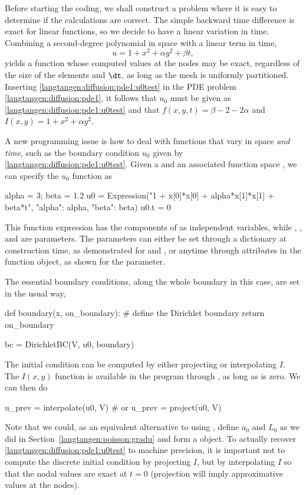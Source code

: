 Before starting the coding, we shall construct a problem where it is
easy to determine if the calculations are correct. The simple backward
time difference is exact for linear functions, so we decide to have
a linear variation in time. Combining a second-degree polynomial in space
with a linear term in time,
\begin{equation}
  u = 1 + x^2 + \alpha y^2 + \beta t,
\label{langtangen:diffusion:pde1:u0test}
\end{equation}
yields a function whose computed values at the nodes may be exact,
regardless of the size of the elements and ${\dt}$, as long as the mesh is
uniformly partitioned.  Inserting \eqref{langtangen:diffusion:pde1:u0test}
in the PDE problem \eqref{langtangen:diffusion:pde1}, it follows that
$u_0$ must be given as \eqref{langtangen:diffusion:pde1:u0test} and that
$f(x,y,t)=\beta - 2 - 2\alpha$ and $I(x,y)=1+x^2+\alpha y^2$.

A new programming issue is how to deal with functions that vary in
space \emph{and time}, such as the boundary condition $u_0$ given by
\eqref{langtangen:diffusion:pde1:u0test}.  Given a  and an
associated function space , we can specify the $u_0$ function
as 
\begin{python}
alpha = 3; beta = 1.2
u0 = Expression("1 + x[0]*x[0] + alpha*x[1]*x[1] + beta*t",
                {"alpha": alpha, "beta": beta})
u0.t = 0
\end{python}
This function expression has the components of  as independent
variables, while , , and  are parameters.
The parameters can either be set through a dictionary at construction
time, as demonstrated for  and , or anytime through
attributes in the function object, as shown for the  parameter.

The essential boundary conditions, along the whole boundary in this case,
are set in the usual way,
\begin{python}
def boundary(x, on_boundary):  # define the Dirichlet boundary
    return on_boundary

bc = DirichletBC(V, u0, boundary)
\end{python}

The initial condition can be computed by either projecting or
interpolating $I$. The $I(x,y)$ function is available in the program
through , as long as  is zero.  We can then do
\begin{python}
u_prev = interpolate(u0, V)
# or
u_prev = project(u0, V)
\end{python}
Note that we could, as an equivalent alternative to using ,
define $a_0$ and $L_0$ as we did in Section~\ref{langtangen:poisson:gradu}
and form a  object.  To actually recover
\eqref{langtangen:diffusion:pde1:u0test} to machine precision, it is
important not to compute the discrete initial condition by projecting
$I$, but by interpolating $I$ so that the nodal values are exact at $t=0$
(projection will imply approximative values at the nodes).

